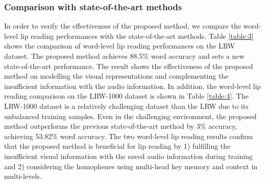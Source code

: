 \documentclass[letterpaper]{article} \usepackage{aaai22}  \usepackage{times}  \usepackage{helvet}  \usepackage{courier}  \usepackage[hyphens]{url}  \usepackage{graphicx} \urlstyle{rm} \def\UrlFont{\rm}  \usepackage{natbib}  \usepackage{caption} \DeclareCaptionStyle{ruled}{labelfont=normalfont,labelsep=colon,strut=off} \frenchspacing  \setlength{\pdfpagewidth}{8.5in}  \setlength{\pdfpageheight}{11in}  \usepackage{algorithm}
\begin{document}
\subsubsection{Comparison with state-of-the-art methods}

In order to verify the effectiveness of the proposed method, we compare the word-level lip reading performances with the state-of-the-art methods. Table \ref{table:3} shows the comparison of word-level lip reading performances on the LRW dataset. The proposed method achieves 88.5\% word accuracy and sets a new state-of-the-art performance. The result shows the effectiveness of the proposed method on modelling the visual representations and complementing the insufficient information with the audio information. In addition, the word-level lip reading comparison on the LRW-1000 dataset is shown in Table \ref{table:4}. The LRW-1000 dataset is a relatively challenging dataset than the LRW due to its unbalanced training samples. Even in the challenging environment, the proposed method outperforms the previous state-of-the-art method \cite{kim2021visualaudiomem} by 3\% accuracy, achieving 53.82\% word accuracy. The two word-level lip reading results confirm that the proposed method is beneficial for lip reading by 1) fulfilling the insufficient visual information with the saved audio information during training and 2) considering the homophenes using multi-head key memory and context in multi-levels.

\begin{table}[t!]
\renewcommand{\arraystretch}{1.4}
\caption{Word accuracy comparison on LRW-1000. 
}
\label{table:4}
\end{table}
\end{document}
